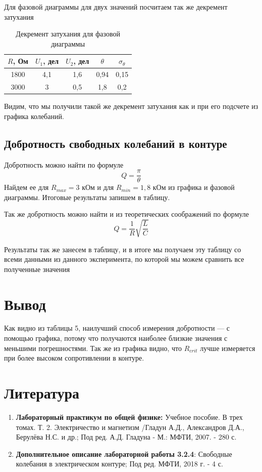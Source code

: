 \documentclass[a4paper, 12pt]{article}%
\begin{document}
Для фазовой диаграммы для двух значений посчитаем так же декремент затухания

\begin{table}[h!]
\begin{center}
\begin{tabular}{|c|c|c|c|c|}
\hline
$R$, Ом &$U_1$, дел & $U_2$, дел & $\theta$ & $\sigma_{\theta}$ \\ \hline
1800 &4,1        & 1,6        & 0,94    & 0,15              \\ \hline
3000& 3          & 0,5        & 1,8     & 0,2              \\ \hline
\end{tabular}
\caption{Декремент затухания для фазовой диаграммы}
\end{center}
\end{table}

Видим, что мы получили такой же декремент затухания как и при его подсчете из графика колебаний.
\subsection{Добротность свободных колебаний в контуре}
Добротность можно найти по формуле 
\[Q = \dfrac{\pi}{\theta}\]
Найдем ее для $R_{max} = 3$ кОм и для $R_{min} = 1,8$ кОм из графика и фазовой диаграммы. Итоговые результаты запишем в таблицу.

Так же добротность можно найти и из теоретических соображений по формуле
\[Q = \dfrac{1}{R}\sqrt{\dfrac{L}{C}}\]

Результаты так же занесем в таблицу, и в итоге мы получаем эту таблицу со всеми данными из данного эксперимента, по которой мы можем сравнить все полученные значения


\section{Вывод}
Как видно из таблицы 5, наилучший способ измерения добротности --- с помощью графика, потому что получаются наиболее близкие значения с меньшими погрешностями. Так же из графика видно, что $R_{crit}$ лучше измеряется при более высоком сопротивлении в контуре. 

\section{Литература}
\begin{enumerate}
\item \textbf{Лабораторный практикум по общей физике:} Учебное пособие. В трех томах. Т. 2. Электричество и магнетизм /Гладун А.Д., Александров Д.А., Берулёва Н.С. и др.; Под ред. А.Д. Гладуна - М.: МФТИ, 2007. - 280 с.
\item \textbf{Дополнительное описание лабораторной работы 3.2.4}: Свободные колебания в электрическом контуре; Под ред. МФТИ, 2018 г. - 4 с.
\end{enumerate}

					
\end{document}

